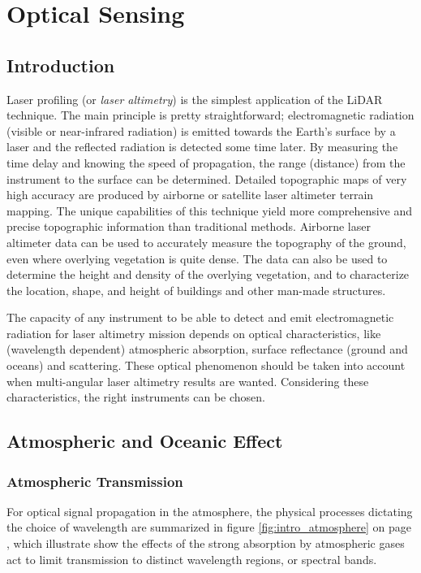 \clearpage
\section{Optical Sensing}
\label{Optical_emitter_receiver}
\subsection{Introduction}
\label{op_intro}
Laser profiling (or \textit{laser altimetry}) is the simplest application of the \acs{LiDAR} technique. The main principle is pretty straightforward; electromagnetic radiation (visible or near-infrared radiation) is emitted towards the Earth's surface by a \acs{laser} and the reflected radiation is detected some time later. By measuring the time delay and knowing the speed of propagation, the range (distance) from the instrument to the surface can be determined. Detailed topographic maps of very high accuracy are produced by airborne or satellite laser altimeter terrain mapping. The unique capabilities of this technique yield more comprehensive and precise topographic information than traditional methods. Airborne laser altimeter data can be used to accurately measure the topography of the ground, even where overlying vegetation is quite dense. The data can also be used to determine the height and density of the overlying vegetation, and to characterize the location, shape, and height of buildings and other man-made structures.


The capacity of any instrument to be able to detect and emit electromagnetic radiation for \acs{laser} altimetry mission depends on optical characteristics, like (wavelength dependent) atmospheric absorption, surface reflectance (ground and oceans) and scattering. These optical phenomenon should be taken into account when multi-angular \acs{laser} altimetry results are wanted. Considering these characteristics, the right instruments can be chosen.

\subsection{Atmospheric and Oceanic Effect}
\label{introAandO}
\subsubsection{Atmospheric Transmission}
\label{introAtmospheric}
For optical signal propagation in the atmosphere, the physical processes dictating the choice of wavelength are summarized in figure \ref{fig:intro_atmosphere} on page \pageref{fig:intro_atmosphere}, which illustrate show the effects of the strong absorption by atmospheric gases act to limit transmission to distinct wavelength regions, or spectral bands.

